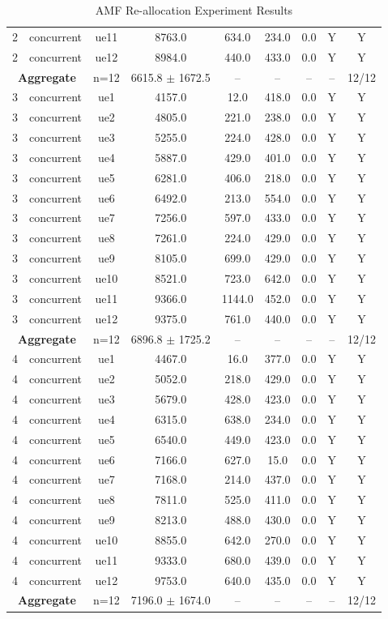 \begin{table}[ht]
\begin{tabular}{|c|c|c|c|c|c|c|c|c|}
2 & concurrent & ue11 & 8763.0 & 634.0 & 234.0 & 0.0 & Y & Y \\
2 & concurrent & ue12 & 8984.0 & 440.0 & 433.0 & 0.0 & Y & Y \\
\multicolumn{2}{|c|}{\textbf{Aggregate}} & n=12 & 6615.8 $\pm$ 1672.5 & -- & -- & -- & -- & 12/12 \\
\hline
3 & concurrent & ue1 & 4157.0 & 12.0 & 418.0 & 0.0 & Y & Y \\
3 & concurrent & ue2 & 4805.0 & 221.0 & 238.0 & 0.0 & Y & Y \\
3 & concurrent & ue3 & 5255.0 & 224.0 & 428.0 & 0.0 & Y & Y \\
3 & concurrent & ue4 & 5887.0 & 429.0 & 401.0 & 0.0 & Y & Y \\
3 & concurrent & ue5 & 6281.0 & 406.0 & 218.0 & 0.0 & Y & Y \\
3 & concurrent & ue6 & 6492.0 & 213.0 & 554.0 & 0.0 & Y & Y \\
3 & concurrent & ue7 & 7256.0 & 597.0 & 433.0 & 0.0 & Y & Y \\
3 & concurrent & ue8 & 7261.0 & 224.0 & 429.0 & 0.0 & Y & Y \\
3 & concurrent & ue9 & 8105.0 & 699.0 & 429.0 & 0.0 & Y & Y \\
3 & concurrent & ue10 & 8521.0 & 723.0 & 642.0 & 0.0 & Y & Y \\
3 & concurrent & ue11 & 9366.0 & 1144.0 & 452.0 & 0.0 & Y & Y \\
3 & concurrent & ue12 & 9375.0 & 761.0 & 440.0 & 0.0 & Y & Y \\
\multicolumn{2}{|c|}{\textbf{Aggregate}} & n=12 & 6896.8 $\pm$ 1725.2 & -- & -- & -- & -- & 12/12 \\
\hline
4 & concurrent & ue1 & 4467.0 & 16.0 & 377.0 & 0.0 & Y & Y \\
4 & concurrent & ue2 & 5052.0 & 218.0 & 429.0 & 0.0 & Y & Y \\
4 & concurrent & ue3 & 5679.0 & 428.0 & 423.0 & 0.0 & Y & Y \\
4 & concurrent & ue4 & 6315.0 & 638.0 & 234.0 & 0.0 & Y & Y \\
4 & concurrent & ue5 & 6540.0 & 449.0 & 423.0 & 0.0 & Y & Y \\
4 & concurrent & ue6 & 7166.0 & 627.0 & 15.0 & 0.0 & Y & Y \\
4 & concurrent & ue7 & 7168.0 & 214.0 & 437.0 & 0.0 & Y & Y \\
4 & concurrent & ue8 & 7811.0 & 525.0 & 411.0 & 0.0 & Y & Y \\
4 & concurrent & ue9 & 8213.0 & 488.0 & 430.0 & 0.0 & Y & Y \\
4 & concurrent & ue10 & 8855.0 & 642.0 & 270.0 & 0.0 & Y & Y \\
4 & concurrent & ue11 & 9333.0 & 680.0 & 439.0 & 0.0 & Y & Y \\
4 & concurrent & ue12 & 9753.0 & 640.0 & 435.0 & 0.0 & Y & Y \\
\multicolumn{2}{|c|}{\textbf{Aggregate}} & n=12 & 7196.0 $\pm$ 1674.0 & -- & -- & -- & -- & 12/12 \\
\hline
\end{tabular}
\caption{AMF Re-allocation Experiment Results}
\label{tab:amf_realloc}
\end{table}
